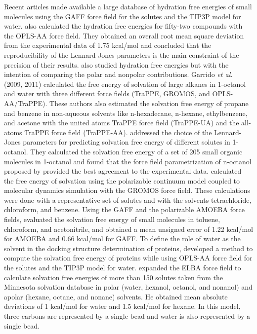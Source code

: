 \documentclass[
	12pt,				%
	openany,			%
	oneside,			%
	a4paper,			%
	english,			%
	brazil				%
	]{abntex2}
\begin{document}
Recent articles \cite{PMID:24928188,mobley2017} made available a large database of hydration free energies of small molecules using the GAFF force field for the
solutes and the TIP3P model for water.  also calculated the hydration free energies for fifty-two compounds with the OPLS-AA force field. They obtained an overall root mean square deviation from the experimental data of 1.75 kcal/mol and concluded that the reproducibility of the Lennard-Jones parameters is the main constraint of the precision of their results.  also studied hydration free energies but with the intention of comparing the polar and nonpolar contributions. Garrido \textit{et al.} (2009, 2011) calculated the free energy of solvation of large alkanes in 1-octanol and water with three different force fields (TraPPE, GROMOS, and OPLS-AA/TraPPE). These authors also estimated the solvation free energy of propane and benzene in non-aqueous solvents like n-hexadecane, n-hexane, ethylbenzene, and acetone with the united atoms TraPPE force field (TraPPE-UA) and the all-atoms TraPPE force field (TraPPE-AA).  addressed the choice of the Lennard-Jones parameters for predicting solvation free energy of different solutes in 1-octanol. They calculated the solvation free energy of a set of 205 small organic molecules in 1-octanol and found that the force field parametrization of n-octanol proposed by  provided the best agreement to the experimental data.  calculated the free energy of solvation using the polarizable continuum model coupled to molecular dynamics simulation with the GROMOS force field. These calculations were done with a representative set of solutes and with the solvents tetrachloride, chloroform, and benzene. Using the GAFF and the polarizable AMOEBA force fields,  evaluated the solvation free energy of small molecules in toluene, chloroform, and acetonitrile, and obtained a mean unsigned error of 1.22 kcal/mol for AMOEBA and 0.66 kcal/mol for GAFF. To define the role of water as the solvent in the docking structure determination of proteins,  developed a method to compute the solvation free energy of proteins while using OPLS-AA force field for the
solutes and the TIP3P model for water.  expanded the ELBA force field to calculate solvation free energies of more than 150 solutes taken from the Minnesota solvation
database in polar (water, hexanol, octanol, and nonanol) and apolar (hexane, octane, and nonane) solvents. He obtained mean absolute deviations of 1 kcal/mol for water and 1.5 kcal/mol for hexane. In this model, three carbons are represented by a single bead and water is also represented by a single bead. 
\end{document}
